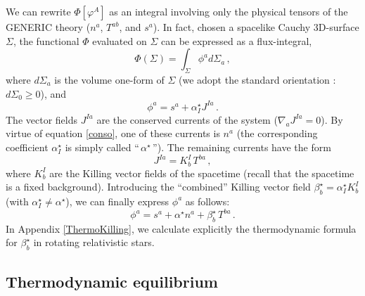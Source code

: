 \documentclass[a4paper, amsfonts, amssymb, amsmath, reprint, showkeys, nofootinbib, twoside, onecolumn, notitlepage]{revtex4-1}
\theoremstyle{definition}
\theoremstyle{theorem}
\begin{document}
We can rewrite $\Phi[\varphi^A]$ as an integral involving only the physical tensors of the GENERIC theory ($n^a$, $T^{ab}$, and $s^a$). In fact, chosen a spacelike Cauchy 3D-surface $\Sigma$, the functional $\Phi$ evaluated on $\Sigma$ can be expressed as a flux-integral,
\begin{equation}\label{flussusso}
\Phi(\Sigma)= \int_\Sigma \phi^a d\Sigma_a \, ,
\end{equation}
where $d\Sigma_a$ is the volume one-form of $\Sigma$ (we adopt the standard orientation \cite{MTW_book}: $d\Sigma_0 \geq 0$), and
\begin{equation}\label{constructphiA}
\phi^a = s^a +\alpha^\star_I J^{Ia} \, .
\end{equation}
The vector fields $J^{Ia}$ are the conserved currents of the system ($\nabla_a J^{Ia}=0$). By virtue of equation \eqref{conso}, one of these currents is $n^a$ (the corresponding coefficient $\alpha^\star_I$ is simply called ``$\, \alpha^\star \,$''). The remaining currents have the form \cite{Hawking1973}
\begin{equation}\label{conCurrentuzze}
J^{I a}= K^I_b \, T^{ba} \, ,
\end{equation} 
where $K^I_b$ are the Killing vector fields of the spacetime (recall that the spacetime is a fixed background). Introducing the  ``combined'' Killing vector field
$\beta^\star_b =\alpha^\star_I K^I_b$ (with $\alpha^\star_I \neq \alpha^\star$), we can finally express $\phi^a$ as follows:
\begin{equation}\label{gringone}
\phi^a = s^a +\alpha^\star n^a + \beta^\star_b \, T^{ba} \, .
\end{equation}
In Appendix \ref{ThermoKilling}, we calculate explicitly the thermodynamic formula for $\beta^\star_b$ in rotating relativistic stars.

\subsection{Thermodynamic equilibrium}
\end{document}
